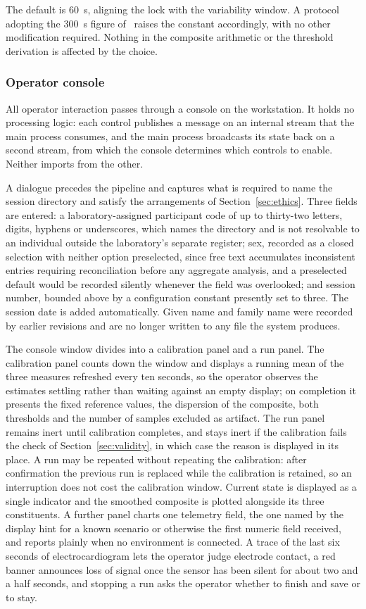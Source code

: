 The default is 60~s, aligning the lock with the variability
window. A protocol adopting the 300~s figure
of~\citet{taskforce1996} raises the constant accordingly, with no
other modification required. Nothing in the composite arithmetic
or the threshold derivation is affected by the choice.

\subsubsection{Operator console}
\label{sec:console}

All operator interaction passes through a console on the
workstation. It holds no processing logic: each control publishes
a message on an internal stream that the main process consumes,
and the main process broadcasts its state back on a second
stream, from which the console determines which controls to
enable. Neither imports from the other.

A dialogue precedes the pipeline and captures what is required to
name the session directory and satisfy the arrangements of
Section~\ref{sec:ethics}. Three fields are entered: a
laboratory-assigned participant code of up to thirty-two letters,
digits, hyphens or underscores, which names the directory and is
not resolvable to an individual outside the laboratory's separate
register; sex, recorded as a closed selection with neither option
preselected, since free text accumulates inconsistent entries
requiring reconciliation before any aggregate analysis, and a
preselected default would be recorded silently whenever the field
was overlooked; and
session number, bounded above by a configuration constant
presently set to three. The session date is added automatically.
Given name and family name were recorded
by earlier revisions and are no longer written to any file the
system produces.

The console window divides into a calibration panel and a run
panel. The calibration panel counts down the window and displays
a running mean of the three measures refreshed every ten seconds,
so the operator observes the estimates settling rather than
waiting against an empty display; on completion it presents the
fixed reference values, the dispersion of the composite, both
thresholds and the number of samples excluded as artifact. The run
panel
remains inert until calibration completes, and stays inert if
the calibration fails the check of Section~\ref{sec:validity}, in
which case the reason is displayed in its place. A run may be
repeated without repeating the calibration: after confirmation the
previous run is replaced while the calibration is retained, so an
interruption does not cost the calibration window. Current state
is displayed as a single indicator and the smoothed composite is
plotted alongside its three constituents. A further panel charts
one telemetry field, the one named by the display hint for a known
scenario or otherwise the first numeric field received, and reports
plainly when no environment is connected. A trace of the last six
seconds of electrocardiogram lets the operator judge electrode
contact, a red banner announces loss of signal once the sensor has
been silent for about two and a half seconds, and stopping a run
asks the operator whether to finish and save or to stay.

